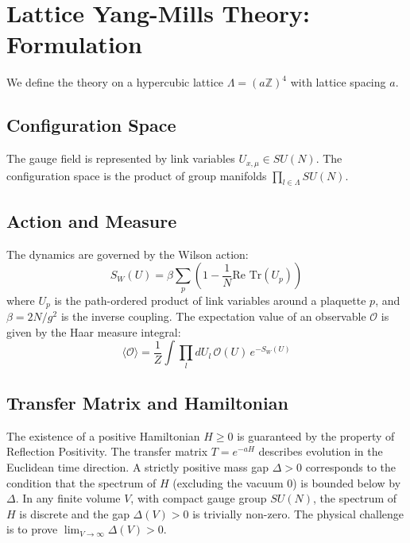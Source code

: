 \section{Lattice Yang-Mills Theory: Formulation}
\label{sec:lattice}

We define the theory on a hypercubic lattice $\Lambda = (a\mathbb{Z})^4$ with lattice spacing $a$.

\subsection{Configuration Space}
The gauge field is represented by link variables $U_{x,\mu} \in SU(N)$. The configuration space is the product of group manifolds $\prod_{l \in \Lambda} SU(N)$.

\subsection{Action and Measure}
The dynamics are governed by the Wilson action:
\begin{equation}
S_W(U) = \beta \sum_{p} \left( 1 - \frac{1}{N} \text{Re Tr}(U_p) \right)
\end{equation}
where $U_p$ is the path-ordered product of link variables around a plaquette $p$, and $\beta = 2N/g^2$ is the inverse coupling.
The expectation value of an observable $\mathcal{O}$ is given by the Haar measure integral:
\begin{equation}
\langle \mathcal{O} \rangle = \frac{1}{Z} \int \prod_{l} dU_l \, \mathcal{O}(U) \, e^{-S_W(U)}
\end{equation}

\subsection{Transfer Matrix and Hamiltonian}
The existence of a positive Hamiltonian $H \ge 0$ is guaranteed by the property of Reflection Positivity. The transfer matrix $T = e^{-aH}$ describes evolution in the Euclidean time direction. A strictly positive mass gap $\Delta > 0$ corresponds to the condition that the spectrum of $H$ (excluding the vacuum 0) is bounded below by $\Delta$.
In any finite volume $V$, with compact gauge group $SU(N)$, the spectrum of $H$ is discrete and the gap $\Delta(V) > 0$ is trivially non-zero. The physical challenge is to prove $\lim_{V \to \infty} \Delta(V) > 0$.
